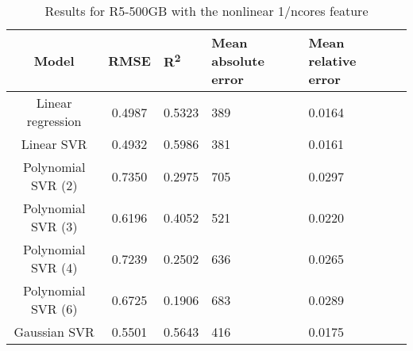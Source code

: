 \begin{table}[H]
\centering
\begin{adjustbox}{center}
\begin{tabular}{c | c M{1.2cm} M{2.5cm} M{2.5cm} M{1.8cm}}
Model & RMSE & R\textsuperscript{2} & Mean absolute error & Mean relative error \tabularnewline
\hline
Linear regression & 0.4987 & 0.5323 &    389 & 0.0164 \\
Linear SVR & 0.4932 & 0.5986 &    381 & 0.0161 \\
Polynomial SVR (2) & 0.7350 & 0.2975 &    705 & 0.0297 \\
Polynomial SVR (3) & 0.6196 & 0.4052 &    521 & 0.0220 \\
Polynomial SVR (4) & 0.7239 & 0.2502 &    636 & 0.0265 \\
Polynomial SVR (6) & 0.6725 & 0.1906 &    683 & 0.0289 \\
Gaussian SVR & 0.5501 & 0.5643 &    416 & 0.0175 \\
\end{tabular}
\end{adjustbox}
\\
\caption{Results for R5-500GB with the nonlinear 1/ncores feature}
\label{tab:all_nonlinear_R5_500}
\end{table}
